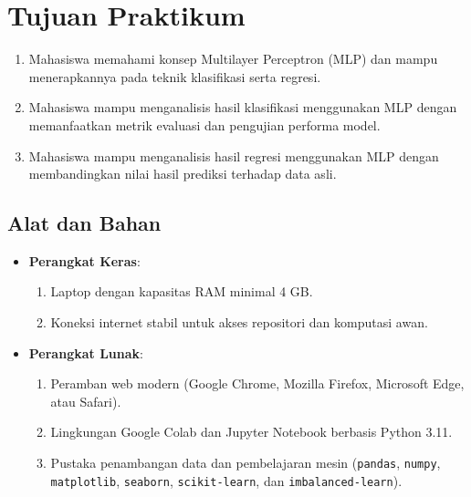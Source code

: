 \documentclass[a4paper,oneside,12pt]{report}
\begin{document}
\tableofcontents
\clearpage

\setcounter{page}{3}

\chapter[Tujuan Praktikum]{Tujuan Praktikum}

\begin{enumerate}
    \item Mahasiswa memahami konsep Multilayer Perceptron (MLP) dan mampu menerapkannya pada teknik klasifikasi serta regresi.
    \item Mahasiswa mampu menganalisis hasil klasifikasi menggunakan MLP dengan memanfaatkan metrik evaluasi dan pengujian performa model.
    \item Mahasiswa mampu menganalisis hasil regresi menggunakan MLP dengan membandingkan nilai hasil prediksi terhadap data asli.
\end{enumerate}

\section*{Alat dan Bahan}
\begin{itemize}
    \item \textbf{Perangkat Keras}:
    \begin{enumerate}
        \item Laptop dengan kapasitas RAM minimal 4 GB.
        \item Koneksi internet stabil untuk akses repositori dan komputasi awan.
    \end{enumerate}
    \item \textbf{Perangkat Lunak}:
    \begin{enumerate}
        \item Peramban web modern (Google Chrome, Mozilla Firefox, Microsoft Edge, atau Safari).
        \item Lingkungan Google Colab dan Jupyter Notebook berbasis Python 3.11.
        \item Pustaka penambangan data dan pembelajaran mesin (\texttt{pandas}, \texttt{numpy}, \texttt{matplotlib}, \texttt{seaborn}, \texttt{scikit-learn}, dan \texttt{imbalanced-learn}).
    \end{enumerate}
\end{itemize}
\end{document}

